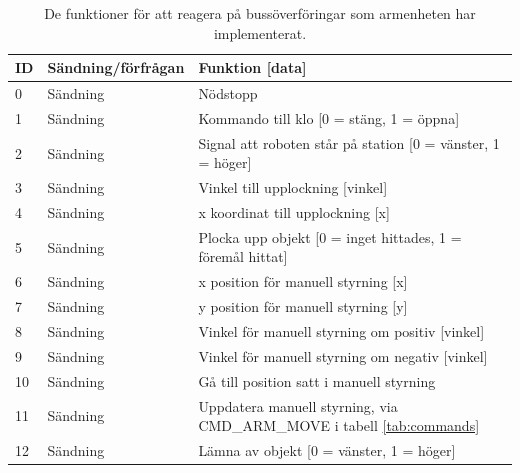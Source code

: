 \begin{table}[H]
\centering

\begin{tabularx}{\textwidth}{|l|l|X|}
\hline
\textbf{ID} & \textbf{Sändning/förfrågan} & \textbf{Funktion [data]} \\ \hline
0 & Sändning & Nödstopp \\ \hline
1 & Sändning & Kommando till klo [0 = stäng, 1 = öppna] \\ \hline
2 & Sändning & Signal att roboten står på station [0 = vänster, 1 = höger] \\ \hline
3 & Sändning & Vinkel till upplockning [vinkel] \\ \hline
4 & Sändning & x koordinat till upplockning [x] \\ \hline
5 & Sändning & Plocka upp objekt [0 = inget hittades, 1 = föremål hittat] \\ \hline
6 & Sändning & x position för manuell styrning [x] \\ \hline
7 & Sändning & y position för manuell styrning [y] \\ \hline
8 & Sändning & Vinkel för manuell styrning om positiv [vinkel] \\ \hline
9 & Sändning & Vinkel för manuell styrning om negativ [vinkel] \\ \hline
10 & Sändning & Gå till position satt i manuell styrning \\ \hline
11 & Sändning & Uppdatera manuell styrning, via CMD\_ARM\_MOVE i tabell \ref{tab:commands} \\ \hline
12 & Sändning & Lämna av objekt [0 = vänster, 1 = höger] \\ \hline
\end{tabularx}
\caption{De funktioner för att reagera på bussöverföringar som armenheten har implementerat.}
\label{tab:callbacks-arm}
\end{table}

